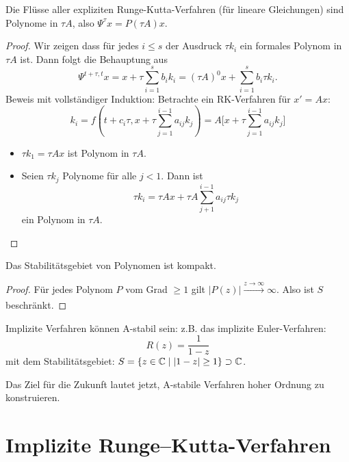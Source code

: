 \begin{lemma}
	Die Flüsse aller expliziten Runge-Kutta-Verfahren (für lineare Gleichungen) sind Polynome in $\tau A$, also $\Psi^{\tau} x=P (\tau A)x$.
\end{lemma}
\begin{proof}
	Wir zeigen dass für jedes $i\le s$ der Ausdruck $\tau k_i$ ein formales Polynom in $\tau A$ ist. Dann folgt die Behauptung aus
	\begin{equation*}
		\Psi^{t+\tau,t}x 
		= x + \tau \sum_{i=1}^s b_i k_i
		= (\tau A)^0 x + \sum_{i=1}^s b_i \tau k_i.
	\end{equation*}
	Beweis mit vollständiger Induktion: Betrachte ein RK-Verfahren für $x' = Ax$:
	\begin{equation*}
		k_i 
		= f(t + c_i \tau, x + \tau \sum_{j=1}^{i-1} a_{ij} k_j)
		= A\Big[ x + \tau \sum_{j=1}^{i-1} a_{ij} k_j \Big]
	\end{equation*}
	\begin{itemize}
		\item $\tau k_1 = \tau Ax$ ist Polynom in $\tau A$.
		\item Seien $\tau k_j$ Polynome für alle $j<1$.  Dann ist
		\begin{equation*}
			\tau k_i = \tau Ax + \tau A \sum_{j+1}^{i-1} a_{ij} \tau k_j
		\end{equation*}
		ein Polynom in $\tau A$.
	\end{itemize}
\end{proof}


\begin{lemma}
	Das Stabilitätsgebiet von Polynomen ist kompakt.
\end{lemma}
\begin{proof}
	Für jedes Polynom $P$ vom Grad $\geq 1$ gilt $\left\vert P(z) \right\vert \xrightarrow[]{z \to \infty} \infty$. Also ist $S$ beschränkt.
\end{proof}

Implizite Verfahren können A-stabil sein: z.B. das implizite Euler-Verfahren: \begin{equation*}
	R(z)=\frac{1}{1-z}
\end{equation*}
mit dem Stabilitätsgebiet: $S=\{ z \in \mathbb C \mid \lvert 1-z \rvert \geq 1 \} \supset \mathbb C$.

\medskip

Das Ziel für die Zukunft lautet jetzt, A-stabile Verfahren hoher Ordnung zu konstruieren.

\section{Implizite Runge--Kutta-Verfahren}

